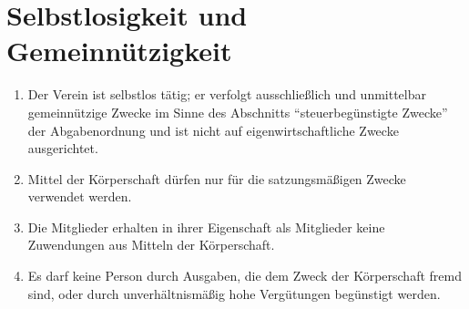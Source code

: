 \documentclass[a4paper,12pt]{scrartcl}
\begin{document}
\section{Selbstlosigkeit und Gemeinnützigkeit}
\begin{enumerate}
  \item Der Verein ist selbstlos tätig; er verfolgt ausschließlich und
    unmittelbar gemeinnützige Zwecke im Sinne des Abschnitts "`steuerbegünstigte
    Zwecke"' der Abgabenordnung und ist nicht auf eigenwirtschaftliche Zwecke
    ausgerichtet.
  \item Mittel der Körperschaft dürfen nur für die satzungsmäßigen Zwecke
    verwendet werden.
  \item Die Mitglieder erhalten in ihrer Eigenschaft als Mitglieder keine
    Zuwendungen aus Mitteln der Körperschaft.
  \item Es darf keine Person durch Ausgaben, die dem Zweck der Körperschaft
    fremd sind, oder durch unverhältnismäßig hohe Vergütungen begünstigt werden.
\end{enumerate}
\end{document}
